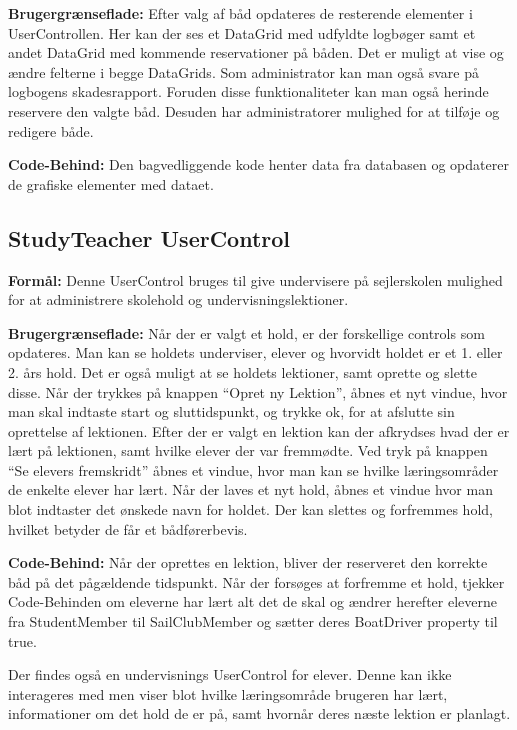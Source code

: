 \textbf{Brugergrænseflade:}
Efter valg af båd opdateres de resterende elementer i UserControllen. 
Her kan der ses et DataGrid med udfyldte logbøger samt et andet DataGrid med kommende reservationer på båden.
Det er muligt at vise og ændre felterne i begge DataGrids.
Som administrator kan man også svare på logbogens skadesrapport.
Foruden disse funktionaliteter kan man også herinde reservere den valgte båd.
Desuden har administratorer mulighed for at tilføje og redigere både.

\textbf{Code-Behind:}
Den bagvedliggende kode henter data fra databasen og opdaterer de grafiske elementer med dataet.

\subsection{StudyTeacher UserControl}

\textbf{Formål:}
Denne UserControl bruges til give undervisere på sejlerskolen mulighed for at administrere skolehold og undervisningslektioner.

\textbf{Brugergrænseflade:}
Når der er valgt et hold, er der forskellige controls som opdateres.
Man kan se holdets underviser, elever og hvorvidt holdet er et 1. eller 2. års hold. 
Det er også muligt at se holdets lektioner, samt oprette og slette disse.
Når der trykkes på knappen ``Opret ny Lektion'', åbnes et nyt vindue, hvor man skal indtaste start og sluttidspunkt, og trykke ok, for at afslutte sin oprettelse af lektionen.
Efter der er valgt en lektion kan der afkrydses hvad der er lært på lektionen, samt hvilke elever der var fremmødte.
Ved tryk på knappen ``Se elevers fremskridt'' åbnes et vindue, hvor man kan se hvilke læringsområder de enkelte elever har lært.
Når der laves et nyt hold, åbnes et vindue hvor man blot indtaster det ønskede navn for holdet.
Der kan slettes og forfremmes hold, hvilket betyder de får et bådførerbevis.

\textbf{Code-Behind:}
Når der oprettes en lektion, bliver der reserveret den korrekte båd på det pågældende tidspunkt.
Når der forsøges at forfremme et hold, tjekker Code-Behinden om eleverne har lært alt det de skal og ændrer herefter eleverne fra StudentMember til SailClubMember og sætter deres BoatDriver property til true.

Der findes også en undervisnings UserControl for elever. 
Denne kan ikke interageres med men viser blot hvilke læringsområde brugeren har lært, informationer om det hold de er på, samt hvornår deres næste lektion er planlagt.

